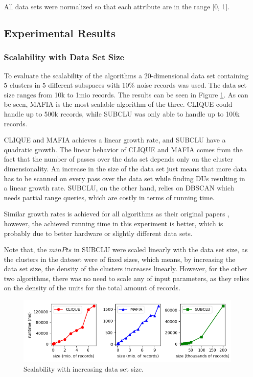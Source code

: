 All data sets were normalized so that each attribute are in the range [0, 1].

\subsection{Experimental Results}

\subsubsection{Scalability with Data Set Size}
To evaluate the scalability of the algorithms a 20-dimensional data set containing 5 clusters in 5 different subspaces with 10\% noise records was used. The data set size ranges from 10k to 1mio records. The results can be seen in Figure \ref{fig:dataset_size_vs_runtime}. As can be seen, MAFIA is the most scalable algorithm of the three. CLIQUE could handle up to 500k records, while SUBCLU was only able to handle up to 100k records.

CLIQUE and MAFIA achieves a linear growth rate, and SUBCLU have a quadratic growth. The linear behavior of CLIQUE and MAFIA comes from the fact that the number of passes over the data set depends only on the cluster dimensionality. An increase in the size of the data set just means that more data has to be scanned on every pass over the data set while finding DUs resulting in a linear growth rate. SUBCLU, on the other hand, relies on DBSCAN which needs partial range queries, which are costly in terms of running time.

Similar growth rates is achieved for all algorithms as their original papers \cite{mafia,clique,subclu}, however, the achieved running time in this experiment is better, which is probably due to better hardware or slightly different data sets.

Note that, the $minPts$ in SUBCLU were scaled linearly with the data set size, as the clusters in the dateset were of fixed sizes, which means, by increasing the data set size, the density of the clusters increases linearly. However, for the other two algorithms, there was no need to scale any of input parameters, as they relies on the density of the units for the total amount of records.
\begin{figure}[H]
    \vspace*{-0.5cm}
    \centering
    \includegraphics[scale=0.45]{figures/dataset_size_vs_runtime.png}
    \caption{Scalability with increasing data set size.}
    \label{fig:dataset_size_vs_runtime}
    \vspace*{-0.5cm}
\end{figure}

